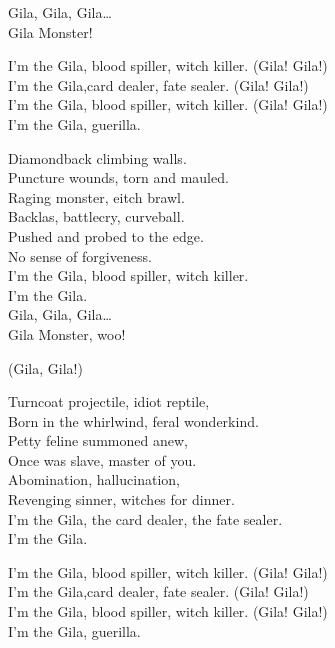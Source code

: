 Gila, Gila, Gila… \\
Gila Monster! \\


I'm the Gila, blood spiller, witch killer. (Gila! Gila!) \\
I'm the Gila,card dealer, fate sealer. (Gila! Gila!) \\
I'm the Gila, blood spiller, witch killer. (Gila! Gila!) \\
I'm the Gila,  guerilla. \\


Diamondback climbing walls. \\
Puncture wounds, torn and mauled. \\
Raging monster, eitch brawl. \\
Backlas, battlecry, curveball. \\
Pushed and probed to the edge. \\
No sense of forgiveness. \\
I'm the Gila, blood spiller, witch killer. \\
I'm the Gila. \\

Gila, Gila, Gila… \\
Gila Monster, woo! \\


(Gila, Gila!)


Turncoat projectile, idiot reptile, \\
Born in the whirlwind, feral wonderkind. \\
Petty feline summoned anew, \\
Once was slave, master of you. \\
Abomination, hallucination, \\
Revenging sinner, witches for dinner. \\
I'm the Gila, the card dealer, the fate sealer. \\
I'm the Gila. \\


I'm the Gila, blood spiller, witch killer. (Gila! Gila!) \\
I'm the Gila,card dealer, fate sealer. (Gila! Gila!) \\
I'm the Gila, blood spiller, witch killer. (Gila! Gila!) \\
I'm the Gila,  guerilla. \\

